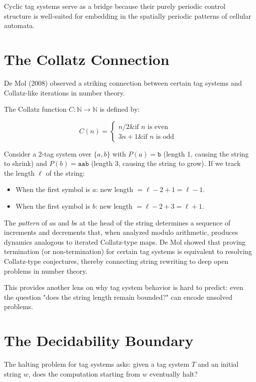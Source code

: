 Cyclic tag systems serve as a bridge because their purely periodic control structure is well-suited for embedding in the spatially periodic patterns of cellular automata.

\section{The Collatz Connection}

De Mol (2008) observed a striking connection between certain tag systems and Collatz-like iterations in number theory.

The Collatz function $C: \mathbb{N} \to \mathbb{N}$ is defined by:

\[C(n) = \begin{cases} n/2 \& \text{if } n \text{ is even} \\ 3n + 1 \& \text{if } n \text{ is odd} \end{cases}\]

Consider a 2-tag system over $\{ a, b\} $ with $P(a) = \texttt{b}$ (length 1, causing the string to shrink) and $P(b) = \texttt{aab}$ (length 3, causing the string to grow). If we track the length $\ell$ of the string:

\begin{itemize}
\item When the first symbol is $a$: new length $= \ell - 2 + 1 = \ell - 1$.
\item When the first symbol is $b$: new length $= \ell - 2 + 3 = \ell + 1$.
\end{itemize}

The \textit{pattern} of $a$s and $b$s at the head of the string determines a sequence of increments and decrements that, when analyzed modulo arithmetic, produces dynamics analogous to iterated Collatz-type maps. De Mol showed that proving termination (or non-termination) for certain tag systems is equivalent to resolving Collatz-type conjectures, thereby connecting string rewriting to deep open problems in number theory.

This provides another lens on why tag system behavior is hard to predict: even the question "does the string length remain bounded?" can encode unsolved problems.

\section{The Decidability Boundary}

The halting problem for tag systems asks: given a tag system $T$ and an initial string $w$, does the computation starting from $w$ eventually halt?


